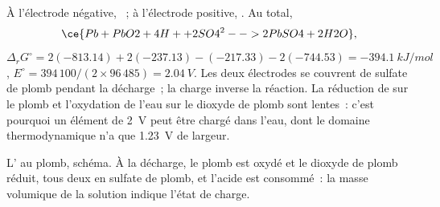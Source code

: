 \begin{example}\label{ex:b2:batteries-electrolysis:lead}
À l'électrode négative, ~; à l'électrode positive,
. Au total,
\[
  \ce{Pb + PbO2 + 4H+ + 2SO4^2- -> 2PbSO4 + 2H2O},
\]
$\Delta_r G^\circ = 2(-813.14) + 2(-237.13) - (-217.33) - 2(-744.53) =
\qty{-394.1}{kJ/mol}$, $E^\circ = 394\,100/(2 \times 96\,485) = \qty{2.04}{V}$.
Les deux électrodes se couvrent de sulfate de plomb pendant la décharge~; la charge
inverse la réaction. La réduction de  sur le plomb et l'oxydation de
l'eau sur le dioxyde de plomb sont lentes~: c'est pourquoi un élément de \qty{2}{V} peut être chargé
dans l'eau, dont le domaine thermodynamique n'a que \qty{1.23}{V} de largeur.
\end{example}

\begin{omfigure}

{\small L' au plomb, schéma. À la décharge, le plomb est oxydé
et le dioxyde de plomb réduit, tous deux en sulfate de plomb, et l'acide est consommé~: la
masse volumique de la solution indique l'état de charge.}
\end{omfigure}

